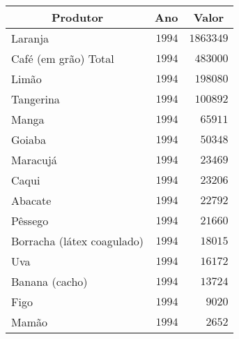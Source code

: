 \begin{table}[!tbp]
\begin{center}
\begin{tabular}{lrr}
\hline\hline
\multicolumn{1}{c}{Produtor}&\multicolumn{1}{c}{Ano}&\multicolumn{1}{c}{Valor}\tabularnewline
\hline
Laranja&$1994$&$1863349$\tabularnewline
Café (em grão) Total&$1994$&$ 483000$\tabularnewline
Limão&$1994$&$ 198080$\tabularnewline
Tangerina&$1994$&$ 100892$\tabularnewline
Manga&$1994$&$  65911$\tabularnewline
Goiaba&$1994$&$  50348$\tabularnewline
Maracujá&$1994$&$  23469$\tabularnewline
Caqui&$1994$&$  23206$\tabularnewline
Abacate&$1994$&$  22792$\tabularnewline
Pêssego&$1994$&$  21660$\tabularnewline
Borracha (látex coagulado)&$1994$&$  18015$\tabularnewline
Uva&$1994$&$  16172$\tabularnewline
Banana (cacho)&$1994$&$  13724$\tabularnewline
Figo&$1994$&$   9020$\tabularnewline
Mamão&$1994$&$   2652$\tabularnewline
\hline
\end{tabular}\end{center}

\end{table}
